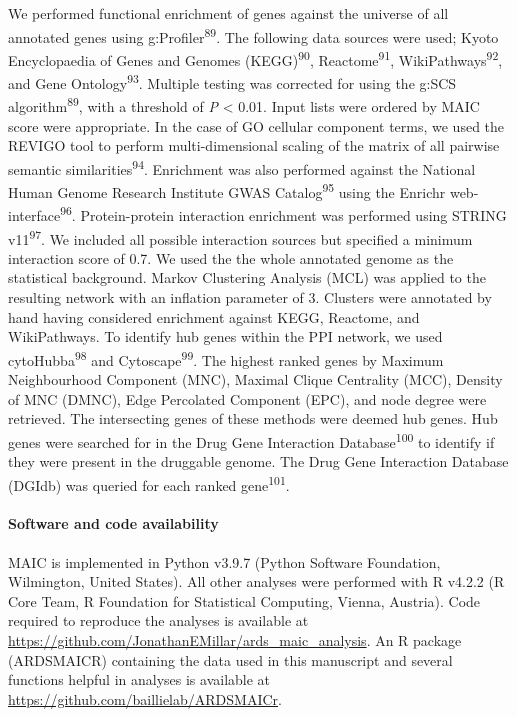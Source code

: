 \documentclass[
  11,
  a4paper,
]{article}
\let\oldparagraph\paragraph
\renewcommand{\paragraph}[1]{\oldparagraph{#1}\mbox{}}
\begin{document}
We performed functional enrichment of genes against the universe of all
annotated genes using g:Profiler\textsuperscript{89}. The following data
sources were used; Kyoto Encyclopaedia of Genes and Genomes
(KEGG)\textsuperscript{90}, Reactome\textsuperscript{91},
WikiPathways\textsuperscript{92}, and Gene Ontology\textsuperscript{93}.
Multiple testing was corrected for using the g:SCS
algorithm\textsuperscript{89}, with a threshold of \emph{P} \textless{}
0.01. Input lists were ordered by MAIC score were appropriate. In the
case of GO cellular component terms, we used the REVIGO tool to perform
multi-dimensional scaling of the matrix of all pairwise semantic
similarities\textsuperscript{94}. Enrichment was also performed against
the National Human Genome Research Institute GWAS
Catalog\textsuperscript{95} using the Enrichr
web-interface\textsuperscript{96}. Protein-protein interaction
enrichment was performed using STRING v11\textsuperscript{97}. We
included all possible interaction sources but specified a minimum
interaction score of 0.7. We used the the whole annotated genome as the
statistical background. Markov Clustering Analysis (MCL) was applied to
the resulting network with an inflation parameter of 3. Clusters were
annotated by hand having considered enrichment against KEGG, Reactome,
and WikiPathways. To identify hub genes within the PPI network, we used
cytoHubba\textsuperscript{98} and Cytoscape\textsuperscript{99}. The
highest ranked genes by Maximum Neighbourhood Component (MNC), Maximal
Clique Centrality (MCC), Density of MNC (DMNC), Edge Percolated
Component (EPC), and node degree were retrieved. The intersecting genes
of these methods were deemed hub genes. Hub genes were searched for in
the Drug Gene Interaction Database\textsuperscript{100} to identify if
they were present in the druggable genome. The Drug Gene Interaction
Database (DGIdb) was queried for each ranked gene\textsuperscript{101}.

\hypertarget{software-and-code-availability}{%
\paragraph{Software and code
availability}\label{software-and-code-availability}}

MAIC is implemented in Python v3.9.7 (Python Software Foundation,
Wilmington, United States). All other analyses were performed with R
v4.2.2 (R Core Team, R Foundation for Statistical Computing, Vienna,
Austria). Code required to reproduce the analyses is available at
\url{https://github.com/JonathanEMillar/ards_maic_analysis}. An R
package (ARDSMAICR) containing the data used in this manuscript and
several functions helpful in analyses is available at
\url{https://github.com/baillielab/ARDSMAICr}.
\end{document}
